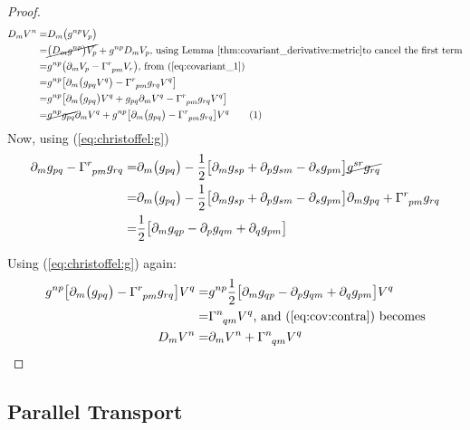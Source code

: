 \documentclass[]{article}
\newcommand\numberthis{\addtocounter{equation}{1}\tag{\theequation}}
\begin{document}
{\begin{proof}
	\begin{align*}
		D_m V^n =& D_m\big( g^{np} V_p\big)\\
		=&  \cancel{\big(D_m g^{np}\big) V_p} +  g^{np} D_m V_p \text{,  using Lemma \ref{thm:covariant_derivative:metric}to cancel the first term} \\
		=& g^{np} \big(\partial_m V_p -  \Gamma\indices{^r_{pm}} V_r\big) \text{, from (\ref{eq:covariant_1})}\\
		=& g^{np} \big[\partial_m \big(g_{pq} V^q\big) -  \Gamma\indices{^r_{pm}} g_{rq} V^q\big]\\
		=& g^{np} \big[ \partial_m \big(g_{pq} \big)V^q + g_{pq} \partial_m V^q -  \Gamma\indices{^r_{pm}} g_{rq} V^q\big]\\
		=& \cancel{g^{np} g_{pq}} \partial_m V^q +  g^{np} \big[ \partial_m \big(g_{pq} \big) -   \Gamma\indices{^r_{pm}} g_{rq} \big] V^q \numberthis\label{eq:cov:contra}
	\end{align*}
	Now, using (\ref{eq:christoffel:g})
	\begin{align*}
		 \partial_m g_{pq} -   \Gamma\indices{^r_{pm}} g_{rq} =&\partial_m \big(g_{pq} \big) - \frac{1}{2}\big[\partial_m g_{sp} + \partial_p g_{sm}- \partial_s g_{pm}\big]  \cancel{g^{sr} g_{rq}}\\
		=& \partial_m \big(g_{pq} \big) - \frac{1}{2}\big[\partial_m g_{sp} + \partial_p g_{sm}- \partial_s g_{pm}\big] \partial_m g_{pq} +   \Gamma\indices{^r_{pm}} g_{rq}\\
		 =& \frac{1}{2}\big[\partial_m g_{qp} - \partial_p g_{qm}+ \partial_q g_{pm}\big] 
	\end{align*}
	
	Using (\ref{eq:christoffel:g}) again:
	\begin{align*}
		g^{np} \big[ \partial_m \big(g_{pq} \big) -   \Gamma\indices{^r_{pm}} g_{rq} \big] V^q =& g^{np} \frac{1}{2}\big[\partial_m g_{qp} - \partial_p g_{qm}+ \partial_q g_{pm}\big] V^q\\
		=& \Gamma \indices{^n_{qm}} V^q \text{, and (\ref{eq:cov:contra}) becomes}\\
		D_m V^n =& \partial_m V^n +  \Gamma \indices{^n_{qm}} V^q
	\end{align*}
	
\end{proof}

\subsection{Parallel Transport}

}
\end{document}
